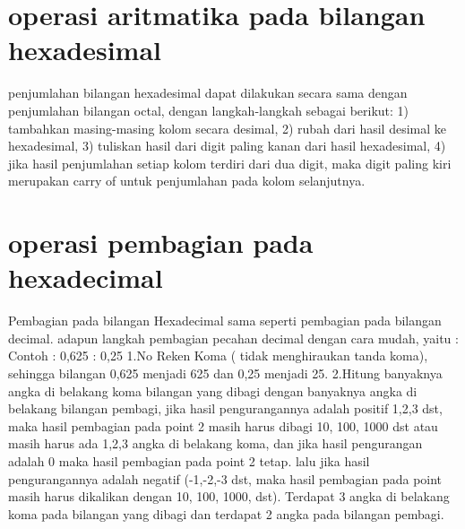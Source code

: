 \section{operasi aritmatika pada bilangan hexadesimal}
penjumlahan bilangan hexadesimal dapat dilakukan secara sama dengan penjumlahan bilangan octal, dengan langkah-langkah sebagai berikut: 1) tambahkan masing-masing kolom secara desimal, 2) rubah dari hasil desimal ke hexadesimal, 3) tuliskan hasil dari digit paling kanan dari hasil hexadesimal, 4) jika hasil penjumlahan setiap kolom terdiri dari dua digit, maka digit paling kiri merupakan carry of untuk penjumlahan pada kolom selanjutnya.
\section {operasi pembagian pada hexadecimal}
Pembagian pada bilangan Hexadecimal sama seperti pembagian pada bilangan decimal. adapun langkah pembagian pecahan decimal dengan cara mudah, yaitu :
	Contoh : 0,625 : 0,25
	1.No Reken Koma ( tidak menghiraukan tanda koma), sehingga bilangan 0,625 menjadi 625 dan 0,25 menjadi 25.
	2.Hitung banyaknya angka di belakang koma bilangan yang dibagi dengan banyaknya angka di belakang bilangan pembagi, jika hasil pengurangannya adalah positif 1,2,3 dst, maka hasil pembagian pada point 2 masih harus dibagi 10, 100, 1000 dst atau masih harus ada 1,2,3 angka di belakang koma, dan jika hasil pengurangan adalah 0 maka hasil pembagian pada point 2 tetap. lalu jika hasil pengurangannya adalah negatif (-1,-2,-3 dst, maka hasil pembagian pada point masih harus dikalikan dengan 10, 100, 1000, dst). Terdapat 3 angka di belakang koma pada bilangan yang dibagi dan terdapat 2 angka pada bilangan pembagi. 

